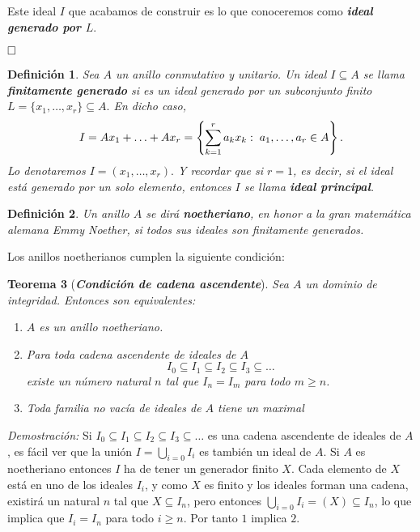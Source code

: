 \documentclass[12pt]{article}
\newtheorem{theorem}{Teorema}[section]
\newtheorem{definition}[theorem]{Definición}
\begin{document}
Este ideal $I$ que acabamos de construir es lo que conoceremos como \textbf{\textit{ideal generado por $L$}}.

$\hfill \square$

\begin{definition} Sea $A$ un anillo conmutativo y unitario. Un ideal $I \subseteq A$ se llama \textbf{finitamente generado} si es un ideal generado por un subconjunto finito $L = \lbrace x_{1}, \ldots, x_{r}\rbrace \subseteq A.$ En dicho caso, $$I = Ax_{1} + \ldots + Ax_{r} = \left\lbrace \sum_{k=1}^{r}a_{k}x_{k} : \hspace{0.1cm} a_{1}, \ldots, a_{r} \in A \right\rbrace.$$ Lo denotaremos $I = (x_{1}, \ldots, x_{r}).$ Y recordar que si $r=1$, es decir, si el ideal está generado por un solo elemento, entonces $I$ se llama \textbf{ideal principal}.
\end{definition}

\begin{definition}
Un anillo $A$ se dirá \textbf{noetheriano}, en honor a la gran matemática alemana Emmy Noether, si todos sus ideales son finitamente generados.
\end{definition}

Los anillos noetherianos cumplen la siguiente condición:

\begin{theorem}[\textbf{\textit{Condición de cadena ascendente}}]
Sea $A$ un dominio de integridad. Entonces son equivalentes:
\begin{enumerate}
\item $A$ es un anillo noetheriano.
\item Para toda cadena ascendente de ideales de $A$ $$I_0 \subseteq I_1 \subseteq I_2 \subseteq I_3 \subseteq \ldots $$ existe un número natural $n$ tal que $I_n = I_m$ para todo $m \geq n$.
\item Toda familia no vacía de ideales de $A$ tiene un maximal
\end{enumerate}
\end{theorem}
\emph{Demostración: }Si $I_0 \subseteq I_1 \subseteq I_2 \subseteq I_3 \subseteq \ldots$ es una cadena ascendente de ideales de $A$, es fácil ver que la unión $I = \bigcup_{i=0} I_i$ es también un ideal de $A$. Si $A$ es noetheriano entonces $I$ ha de tener un generador finito $X$. Cada elemento de $X$ está en uno de los ideales $I_i$, y como $X$ es finito y los ideales forman una cadena, existirá un natural $n$ tal que $X \subseteq I_n$, pero entonces $\bigcup _{i=0} I_i = (X) \subseteq I_n$, lo que implica que $I_i = I_n$ para todo $i \geq n$. Por tanto $1$ implica $2$.
\end{document}
